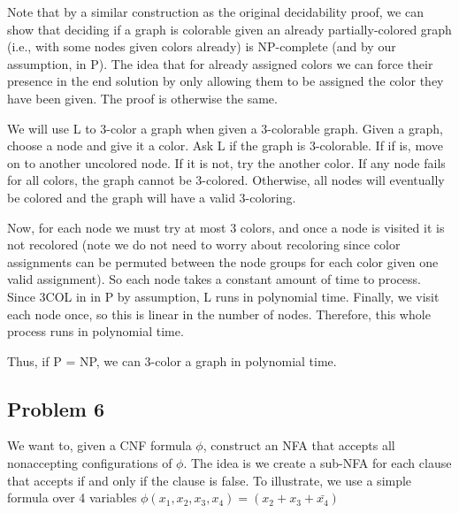 \documentclass[english]{article}
\begin{document}
Note that by a similar construction as the original decidability proof, we can show that deciding if
a graph is colorable given an already partially-colored graph (i.e., with some nodes given colors
already) is NP-complete (and by our assumption, in P). The idea that for already assigned colors
we can force their presence in the end solution by only allowing them to be assigned the color they
have been given. The proof is otherwise the same.

We will use L to 3-color a graph when given a 3-colorable graph. Given a graph, choose a node and
give it a color. Ask L if the graph is 3-colorable. If if is, move on to another uncolored node. If
it is not, try the another color. If any node fails for all colors, the graph cannot be 3-colored.
Otherwise, all nodes will eventually be colored and the graph will have a valid 3-coloring.

Now, for each node we must try at most 3 colors, and once a node is visited it is not recolored (note
we do not need to worry about recoloring since color assignments can be permuted between the node
groups for each color given one valid assignment). So each node takes a constant amount of time to
process. Since 3COL in in P by assumption, L runs in polynomial time. Finally, we visit each node
once, so this is linear in the number of nodes. Therefore, this whole process runs in polynomial time.

Thus, if P = NP, we can 3-color a graph in polynomial time.

\subsection*{Problem 6}
We want to, given a CNF formula $\phi$, construct an NFA that accepts all nonaccepting configurations of $\phi$.
The idea is we create a sub-NFA for each clause that accepts if and only if the clause is false. To illustrate,
we use a simple formula over 4 variables $\phi(x_1,x_2,x_3,x_4) = (x_2 + x_3 + \bar{x_4})$

\end{document}
